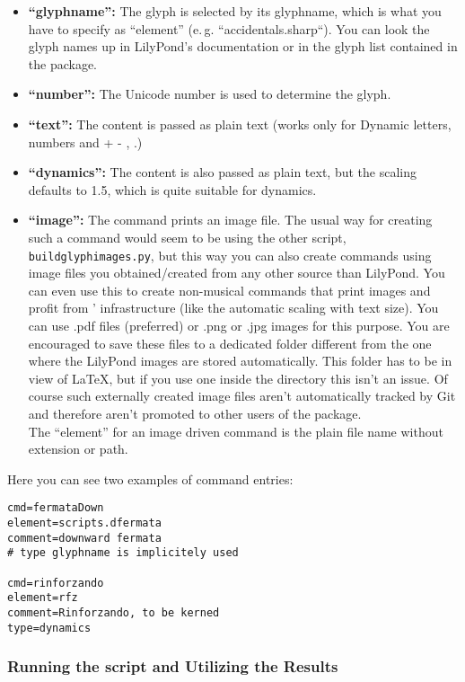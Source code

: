 \documentclass{article}
\begin{document}
\begin{itemize}
	\begin{itemize}
		\item \textbf{“glyphname”:} The glyph is selected by its glyphname, which is what you have to specify as “element” (e.\,g. “accidentals.sharp“).
		You can look the glyph names up in LilyPond's documentation or in the glyph list contained in the package.
		\item \textbf{“number”:} The Unicode number is used to determine the glyph.
		\item \textbf{“text”:} The content is passed as plain text (works only for Dynamic letters, numbers and + - , .)
		\item \textbf{“dynamics”:} The content is also passed as plain text, but the scaling defaults to 1.5, which is quite suitable for dynamics.
		\item \textbf{“image”:} The command prints an image file.
		The usual way for creating such a command would seem to be using the other script, \texttt{buildglyphimages.py}, but this way you can also create commands using image files you obtained/created from any other source than LilyPond.
		You can even use this to create non-musical commands that print images and profit from \lilyglyphs' infrastructure (like the automatic scaling with text size).
		You can use .pdf files (preferred) or .png or .jpg images for this purpose.
		You are encouraged to save these files to a dedicated folder different from the one where the LilyPond images are stored automatically.
		This folder has to be in view of \LaTeX, but if you use one inside the \lilyglyphs{} directory this isn't an issue.
		Of course such externally created image files aren't automatically tracked by Git and therefore aren't promoted to other users of the package.\\
		The “element” for an image driven command is the plain file name without extension or path.
	\end{itemize}
\end{itemize}

\noindent Here you can see two examples of command entries:
\begin{verbatim}
cmd=fermataDown
element=scripts.dfermata
comment=downward fermata
# type glyphname is implicitely used

cmd=rinforzando
element=rfz
comment=Rinforzando, to be kerned
type=dynamics
\end{verbatim}

\subsubsection{Running the script and Utilizing the Results}
\label{subsubsec:GGC_running_utilizing}
\end{document}
